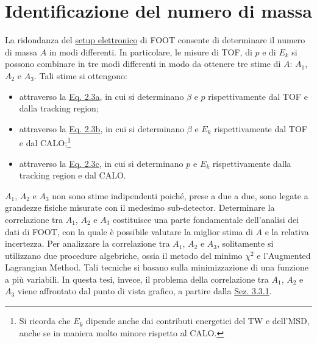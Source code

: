 \documentclass[12pt,a4paper,twoside]{report}
\begin{document}
	\section{Identificazione del numero di massa}
	La ridondanza del \hyperref[sec:setupElettronico]{setup elettronico} di FOOT consente di determinare il numero di massa $A$ in modi differenti. In particolare, le misure di TOF, di $p$ e di $E_k$ si possono combinare in tre modi differenti in modo da ottenere tre stime di $A$: $A_1$, $A_2$ e $A_3$. Tali stime si ottengono:
	\begin{itemize}
		\item attraverso la \hyperref[eq:a1]{Eq. 2.3a}, in cui si determinano $\beta$ e $p$ rispettivamente dal TOF e dalla tracking region;
		\item attraverso la \hyperref[eq:a2]{Eq. 2.3b}, in cui si determinano $\beta$ e $E_k$ rispettivamente dal TOF e dal CALO;\footnote{Si ricorda che $E_k$ dipende anche dai contributi energetici del TW e dell'MSD, anche se in maniera molto minore rispetto al CALO.}
		\item attraverso la \hyperref[eq:a3]{Eq. 2.3c}, in cui si determinano $p$ e $E_k$ rispettivamente dalla tracking region e dal CALO.
	\end{itemize}
	$A_1$, $A_2$ e $A_3$ non sono stime indipendenti poiché, prese a due a due, sono legate a grandezze fisiche misurate con il medesimo sub-detector. Determinare la correlazione tra $A_1$, $A_2$ e $A_3$ costituisce una parte fondamentale dell'analisi dei dati di FOOT, con la quale è possibile valutare la miglior stima di $A$ e la relativa incertezza. Per analizzare la correlazione tra $A_1$, $A_2$ e $A_3$, solitamente si utilizzano due procedure algebriche, ossia il metodo del minimo $\chi^2$ e l'Augmented Lagrangian Method. Tali tecniche si basano sulla minimizzazione di una funzione a più variabili. In questa tesi, invece, il problema della correlazione tra $A_1$, $A_2$ e $A_3$ viene affrontato dal punto di vista grafico, a partire dalla \hyperref[sec:correlation_number_mass]{Sez. 3.3.1}.
	
\end{document}
